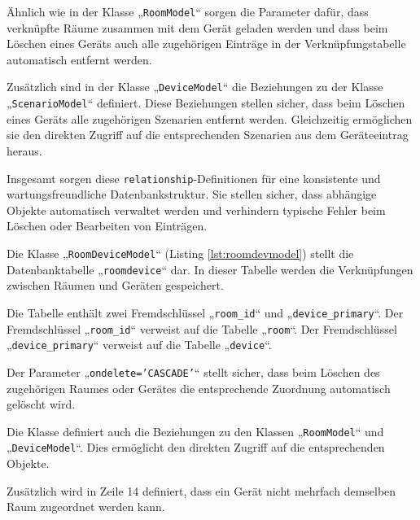 \documentclass[12pt, letterpaper]{article}
\begin{document}
  \par Ähnlich wie in der Klasse „\texttt{RoomModel}“ sorgen die Parameter dafür, dass verknüpfte Räume zusammen mit dem Gerät geladen werden und dass beim Löschen eines Geräts auch alle zugehörigen Einträge in der Verknüpfungstabelle automatisch entfernt werden.
  \par Zusätzlich sind in der Klasse „\texttt{DeviceModel}“ die Beziehungen zu der Klasse „\texttt{ScenarioModel}“ definiert. Diese Beziehungen stellen sicher, dass beim Löschen eines Geräts alle zugehörigen Szenarien entfernt werden. Gleichzeitig ermöglichen sie den direkten Zugriff auf die entsprechenden Szenarien aus dem Geräteeintrag heraus.
  \par Insgesamt sorgen diese \texttt{relationship}-Definitionen für eine konsistente und wartungsfreundliche Datenbankstruktur. Sie stellen sicher, dass abhängige Objekte automatisch verwaltet werden und verhindern typische Fehler beim Löschen oder Bearbeiten von Einträgen.
  \par Die Klasse „\texttt{RoomDeviceModel}“ (Listing \ref{lst:roomdevmodel}) stellt die Datenbanktabelle „\texttt{roomdevice}“ dar. In dieser Tabelle werden die Verknüpfungen zwischen Räumen und Geräten gespeichert.
  \par Die Tabelle enthält zwei Fremdschlüssel „\texttt{room\_id}“ und „\texttt{device\_primary}“. Der Fremdschlüssel „\texttt{room\_id}“ verweist auf die Tabelle „\texttt{room}“. Der Fremdschlüssel „\texttt{device\_primary}“ verweist auf die Tabelle „\texttt{device}“. 
  \par Der Parameter „\texttt{ondelete='CASCADE'}“ stellt sicher, dass beim Löschen des zugehörigen Raumes oder Gerätes die entsprechende Zuordnung automatisch gelöscht wird.
  \par Die Klasse definiert auch die Beziehungen zu den Klassen „\texttt{RoomModel}“ und „\texttt{DeviceModel}“. Dies ermöglicht den direkten Zugriff auf die entsprechenden Objekte.
  \par Zusätzlich wird in Zeile 14 definiert, dass ein Gerät nicht mehrfach demselben Raum zugeordnet werden kann. 
\end{document}
